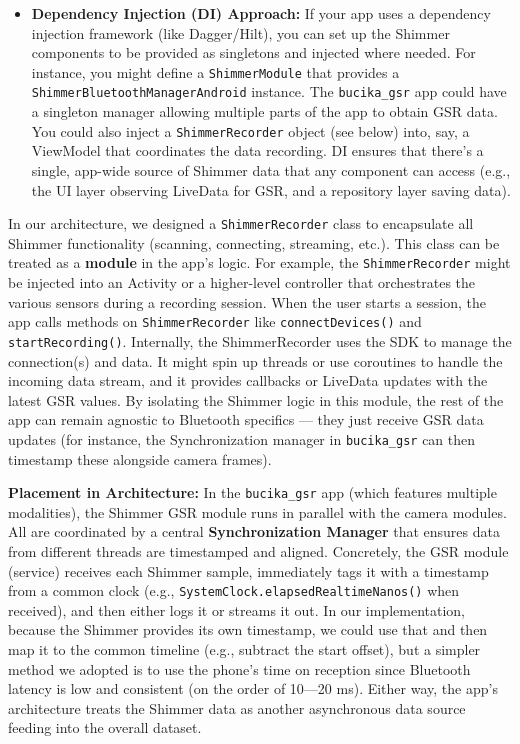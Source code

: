 {{\begin{itemize}
\item \textbf{Dependency Injection (DI) Approach:} If your app uses a dependency
  injection framework (like Dagger/Hilt), you can set up the Shimmer
  components to be provided as singletons and injected where needed. For
  instance, you might define a \texttt{ShimmerModule} that provides a
  \texttt{ShimmerBluetoothManagerAndroid} instance. The \texttt{bucika_gsr} app could
  have a singleton manager allowing multiple parts of the app to obtain
  GSR data. You could also inject a \texttt{ShimmerRecorder} object (see below)
  into, say, a ViewModel that coordinates the data recording. DI ensures
  that there's a single, app-wide source of Shimmer data that any
  component can access (e.g., the UI layer observing LiveData for GSR,
  and a repository layer saving data).

\end{itemize}
In our architecture, we designed a \texttt{ShimmerRecorder} class to
encapsulate all Shimmer functionality (scanning, connecting, streaming,
etc.)\cite{ref31}\cite{ref32}.
This class can be treated as a \textbf{module} in the app's logic. For
example, the \texttt{ShimmerRecorder} might be injected into an Activity or a
higher-level controller that orchestrates the various sensors during a
recording session. When the user starts a session, the app calls methods
on \texttt{ShimmerRecorder} like \texttt{connectDevices()} and
\texttt{startRecording()}\cite{ref33}\cite{ref34}.
Internally, the ShimmerRecorder uses the SDK to manage the connection(s)
and data. It might spin up threads or use coroutines to handle the
incoming data stream, and it provides callbacks or LiveData updates with
the latest GSR values. By isolating the Shimmer logic in this module,
the rest of the app can remain agnostic to Bluetooth specifics --- they
just receive GSR data updates (for instance, the Synchronization manager
in \texttt{bucika_gsr} can then timestamp these alongside camera frames).

\textbf{Placement in Architecture:} In the \texttt{bucika_gsr} app (which features
multiple modalities), the Shimmer GSR module runs in parallel with the
camera modules. All are coordinated by a central \textbf{Synchronization
Manager} that ensures data from different threads are timestamped and
aligned\cite{ref10}.
Concretely, the GSR module (service) receives each Shimmer sample,
immediately tags it with a timestamp from a common clock (e.g.,
\texttt{SystemClock.elapsedRealtimeNanos()} when
received)\cite{ref10}\cite{ref35},
and then either logs it or streams it out. In our implementation,
because the Shimmer provides its own timestamp, we could use that and
then map it to the common timeline (e.g., subtract the start offset),
but a simpler method we adopted is to use the phone's time on reception
since Bluetooth latency is low and consistent (on the order of 10---20
ms)\cite{ref35}.
Either way, the app's architecture treats the Shimmer data as another
asynchronous data source feeding into the overall dataset.

}}

